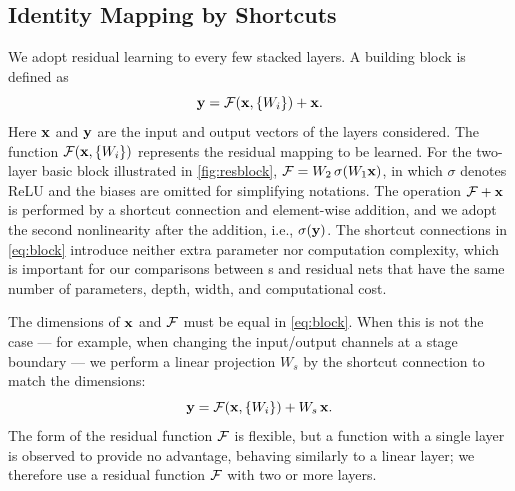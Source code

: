 \subsection{Identity Mapping by Shortcuts}
\label{sec:shortcut}
We adopt residual learning to every few stacked layers. A building block is
defined as
\begin{equation}
\mathbf{y} = \mathcal{F}(\mathbf{x}, \{W_i\}) + \mathbf{x} .
\label{eq:block}
\end{equation}
Here $\mathbf{x}$ and $\mathbf{y}$ are the input and output vectors of the layers
considered. The function $\mathcal{F}(\mathbf{x}, \{W_i\})$ represents the residual mapping
to be learned. For the two-layer basic block illustrated in
\cref{fig:resblock}, $\mathcal{F} = W_2\,\sigma(W_1\mathbf{x})$, in which $\sigma$ denotes
ReLU and the biases are omitted for simplifying notations. The operation
$\mathcal{F} + \mathbf{x}$ is performed by a shortcut connection and element-wise addition,
and we adopt the second nonlinearity after the addition, i.e.,
$\sigma(\mathbf{y})$. The shortcut connections in \cref{eq:block} introduce neither
extra parameter nor computation complexity, which is important for our
comparisons between \plainnet{}s and residual nets that have the same number of
parameters, depth, width, and computational cost.

The dimensions of $\mathbf{x}$ and $\mathcal{F}$ must be equal in \cref{eq:block}. When this
is not the case --- for example, when changing the input/output channels at a
stage boundary --- we perform a linear projection $W_s$ by the shortcut
connection to match the dimensions:
\begin{equation}
\mathbf{y} = \mathcal{F}(\mathbf{x}, \{W_i\}) + W_s\,\mathbf{x} .
\label{eq:proj}
\end{equation}
The form of the residual function $\mathcal{F}$ is flexible, but a function with a
single layer is observed to provide no advantage, behaving similarly to a linear
layer; we therefore use a residual function $\mathcal{F}$ with two or more layers.


